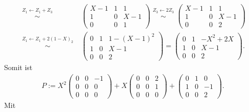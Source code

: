 \documentclass[../../main.tex]{subfiles}
\begin{document}
\begin{bsp}
\begin{align*}
\stackrel{\begin{smallmatrix}Z_1\leftarrow Z_1+Z_3\end{smallmatrix}}{\sim}&\begin{pmatrix}X-1&1&1\\1&0&X-1\\0&0&1\end{pmatrix}\stackrel{\begin{smallmatrix}Z_3\leftarrow 2Z_3\end{smallmatrix}}{\sim}\begin{pmatrix}X-1&1&1\\1&0&X-1\\0&0&2\end{pmatrix}\\
\stackrel{\begin{smallmatrix}Z_1\leftarrow Z_1+2(1-X)_2\end{smallmatrix}}{\sim}&\begin{pmatrix}0&1&1-(X-1)^2\\1&0&X-1\\0&0&2\end{pmatrix}=\begin{pmatrix}0&1&-X^2+2X\\1&0&X-1\\0&0&2\end{pmatrix}.
\end{align*}
Somit ist
\begin{align*}
P:=X^2\begin{pmatrix}0&0&-1\\0&0&0\\0&0&0\end{pmatrix}+X\begin{pmatrix}0&0&2\\0&0&1\\0&0&0\end{pmatrix}+\begin{pmatrix}0&1&0\\1&0&-1\\0&0&2\end{pmatrix}.
\end{align*}
Mit
\begin{align*}

\end{align*}
\end{bsp}
\end{document}
